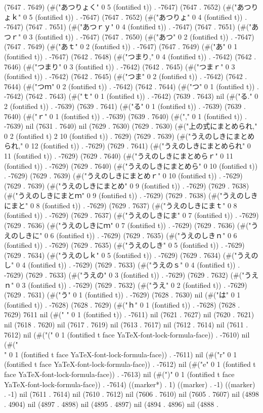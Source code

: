 (7647 . 7649) (#("あつりょく" 0 5 (fontified t)) . -7647) (7647 . 7652) (#("あつりょｋ" 0 5 (fontified t)) . -7647) (7647 . 7652) (#("あつりょ" 0 4 (fontified t)) . -7647) (7647 . 7651) (#("あつｒｙ" 0 4 (fontified t)) . -7647) (7647 . 7651) (#("あつｒ" 0 3 (fontified t)) . -7647) (7647 . 7650) (#("あつ" 0 2 (fontified t)) . -7647) (7647 . 7649) (#("あｔ" 0 2 (fontified t)) . -7647) (7647 . 7649) (#("あ" 0 1 (fontified t)) . -7647) (7642 . 7648) (#("つまり," 0 4 (fontified t)) . -7642) (7642 . 7646) (#("つまり" 0 3 (fontified t)) . -7642) (7642 . 7645) (#("つまｒ" 0 3 (fontified t)) . -7642) (7642 . 7645) (#("つま" 0 2 (fontified t)) . -7642) (7642 . 7644) (#("つｍ" 0 2 (fontified t)) . -7642) (7642 . 7644) (#("つ" 0 1 (fontified t)) . -7642) (7642 . 7643) (#("ｔ" 0 1 (fontified t)) . -7642) (7639 . 7643) nil (#("る." 0 2 (fontified t)) . -7639) (7639 . 7641) (#("る" 0 1 (fontified t)) . -7639) (7639 . 7640) (#("ｒ" 0 1 (fontified t)) . -7639) (7639 . 7640) (#("," 0 1 (fontified t)) . -7639) nil (7631 . 7640) nil (7629 . 7630) (7629 . 7630) (#("上の式にまとめられ," 0 2 (fontified t) 2 10 (fontified t)) . 7629) (7629 . 7639) (#("うえのしきにまとめられ," 0 12 (fontified t)) . -7629) (7629 . 7641) (#("うえのしきにまとめられ" 0 11 (fontified t)) . -7629) (7629 . 7640) (#("うえのしきにまとめらｒ" 0 11 (fontified t)) . -7629) (7629 . 7640) (#("うえのしきにまとめら" 0 10 (fontified t)) . -7629) (7629 . 7639) (#("うえのしきにまとめｒ" 0 10 (fontified t)) . -7629) (7629 . 7639) (#("うえのしきにまとめ" 0 9 (fontified t)) . -7629) (7629 . 7638) (#("うえのしきにまとｍ" 0 9 (fontified t)) . -7629) (7629 . 7638) (#("うえのしきにまと" 0 8 (fontified t)) . -7629) (7629 . 7637) (#("うえのしきにまｔ" 0 8 (fontified t)) . -7629) (7629 . 7637) (#("うえのしきにま" 0 7 (fontified t)) . -7629) (7629 . 7636) (#("うえのしきにｍ" 0 7 (fontified t)) . -7629) (7629 . 7636) (#("うえのしきに" 0 6 (fontified t)) . -7629) (7629 . 7635) (#("うえのしきｎ" 0 6 (fontified t)) . -7629) (7629 . 7635) (#("うえのしき" 0 5 (fontified t)) . -7629) (7629 . 7634) (#("うえのしｋ" 0 5 (fontified t)) . -7629) (7629 . 7634) (#("うえのし" 0 4 (fontified t)) . -7629) (7629 . 7633) (#("うえのｓ" 0 4 (fontified t)) . -7629) (7629 . 7633) (#("うえの" 0 3 (fontified t)) . -7629) (7629 . 7632) (#("うえｎ" 0 3 (fontified t)) . -7629) (7629 . 7632) (#("うえ" 0 2 (fontified t)) . -7629) (7629 . 7631) (#("う" 0 1 (fontified t)) . -7629) (7628 . 7630) nil (#("は" 0 1 (fontified t)) . -7628) (7628 . 7629) (#("ｈ" 0 1 (fontified t)) . -7628) (7628 . 7629) 7611 nil (#(" " 0 1 (fontified t)) . -7611) nil (7621 . 7627) nil (7620 . 7621) nil (7618 . 7620) nil (7617 . 7619) nil (7613 . 7617) nil (7612 . 7614) nil (7611 . 7612) nil (#("(" 0 1 (fontified t face YaTeX-font-lock-formula-face)) . -7610) nil (#("\\" 0 1 (fontified t face YaTeX-font-lock-formula-face)) . -7611) nil (#("r" 0 1 (fontified t face YaTeX-font-lock-formula-face)) . -7612) nil (#("e" 0 1 (fontified t face YaTeX-font-lock-formula-face)) . -7613) nil (#(")" 0 1 (fontified t face YaTeX-font-lock-formula-face)) . -7614) ((marker*) . 1) ((marker) . -1) ((marker) . -1) nil (7611 . 7614) nil (7610 . 7612) nil (7606 . 7610) nil (7605 . 7607) nil (4898 . 4904) nil (4897 . 4898) nil (4895 . 4897) nil (4894 . 4896) nil (4888 . 